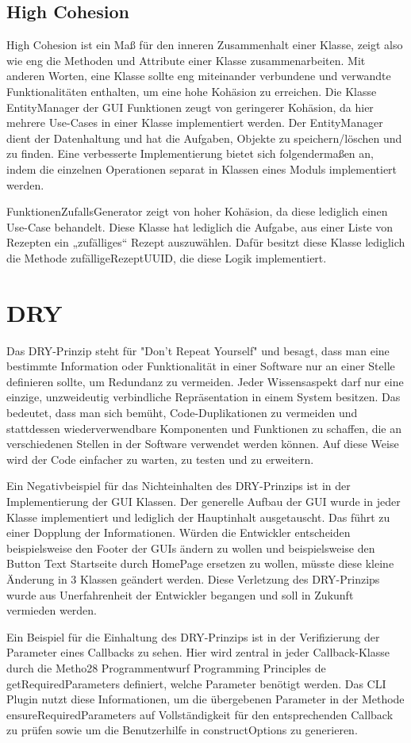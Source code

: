 \subsection{High Cohesion}
High Cohesion  ist ein Maß für den inneren Zusammenhalt einer Klasse, zeigt also wie eng
die Methoden und Attribute einer Klasse zusammenarbeiten. Mit anderen Worten, eine Klasse sollte eng miteinander verbundene und verwandte Funktionalitäten enthalten, um eine hohe Kohäsion zu erreichen. 
Die Klasse EntityManager der GUI Funktionen zeugt von geringerer Kohäsion, da hier mehrere Use-Cases in einer Klasse implementiert werden. Der EntityManager dient der Datenhaltung und hat die Aufgaben, Objekte zu speichern/löschen und zu finden. Eine
verbesserte Implementierung bietet sich folgendermaßen an, indem die einzelnen Operationen separat in Klassen
eines Moduls implementiert werden.

FunktionenZufallsGenerator zeigt von hoher Kohäsion, da diese lediglich einen Use-Case behandelt. Diese Klasse hat lediglich die Aufgabe, aus einer Liste von Rezepten
ein „zufälliges“ Rezept auszuwählen. Dafür besitzt diese Klasse
lediglich die Methode zufälligeRezeptUUID, die diese Logik implementiert.

\section{DRY}
Das DRY-Prinzip steht für "Don't Repeat Yourself" und besagt, dass man eine bestimmte Information oder Funktionalität in einer Software nur an einer Stelle definieren sollte, um Redundanz zu vermeiden. Jeder Wissensaspekt darf nur eine einzige,
unzweideutig verbindliche Repräsentation in einem
System besitzen.
Das bedeutet, dass man sich bemüht, Code-Duplikationen zu vermeiden und stattdessen wiederverwendbare Komponenten und Funktionen zu schaffen, die an verschiedenen Stellen in der Software verwendet werden können. Auf diese Weise wird der Code einfacher zu warten, zu testen und zu erweitern.

Ein Negativbeispiel für das Nichteinhalten des DRY-Prinzips ist in der Implementierung
der GUI Klassen. Der generelle Aufbau der GUI wurde in jeder Klasse implementiert und lediglich der Hauptinhalt ausgetauscht. Das führt zu einer Dopplung der Informationen. Würden die Entwickler entscheiden beispielsweise den Footer der GUIs ändern zu wollen und beispielsweise den Button Text Startseite durch HomePage ersetzen zu wollen, müsste diese kleine Änderung in 3 Klassen geändert werden. Diese Verletzung des DRY-Prinzips wurde aus Unerfahrenheit der Entwickler begangen und soll in Zukunft vermieden werden. 

Ein Beispiel für die Einhaltung des DRY-Prinzips ist in der Verifizierung der Parameter
eines Callbacks zu sehen. Hier wird zentral in jeder Callback-Klasse durch die Metho28
Programmentwurf Programming Principles
de getRequiredParameters definiert, welche Parameter benötigt werden. Das CLI
Plugin nutzt diese Informationen, um die übergebenen Parameter in der Methode ensureRequiredParameters auf Vollständigkeit für den entsprechenden Callback zu
prüfen sowie um die Benutzerhilfe in constructOptions zu generieren.

